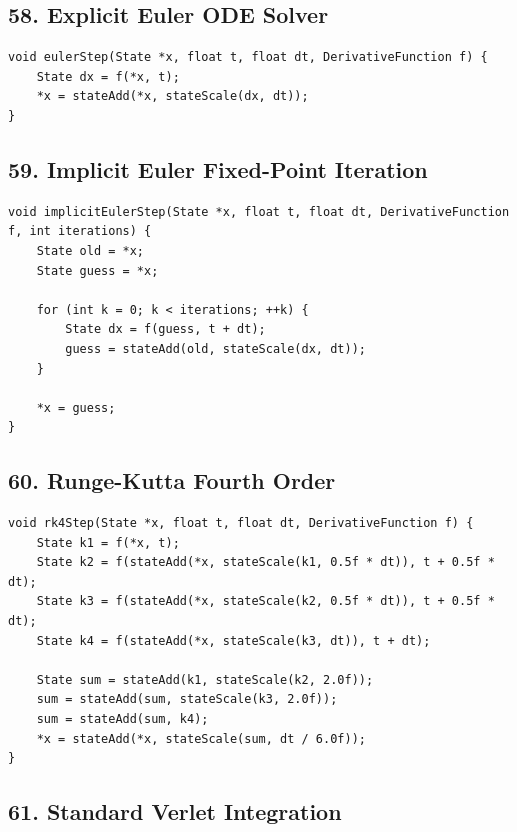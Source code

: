\documentclass[10pt,letterpaper]{article}
\begin{document}
\subsection*{58. Explicit Euler ODE Solver}

\begin{verbatim}
void eulerStep(State *x, float t, float dt, DerivativeFunction f) {
    State dx = f(*x, t);
    *x = stateAdd(*x, stateScale(dx, dt));
}
\end{verbatim}

\subsection*{59. Implicit Euler Fixed-Point Iteration}

\begin{verbatim}
void implicitEulerStep(State *x, float t, float dt, DerivativeFunction f, int iterations) {
    State old = *x;
    State guess = *x;

    for (int k = 0; k < iterations; ++k) {
        State dx = f(guess, t + dt);
        guess = stateAdd(old, stateScale(dx, dt));
    }

    *x = guess;
}
\end{verbatim}

\subsection*{60. Runge-Kutta Fourth Order}

\begin{verbatim}
void rk4Step(State *x, float t, float dt, DerivativeFunction f) {
    State k1 = f(*x, t);
    State k2 = f(stateAdd(*x, stateScale(k1, 0.5f * dt)), t + 0.5f * dt);
    State k3 = f(stateAdd(*x, stateScale(k2, 0.5f * dt)), t + 0.5f * dt);
    State k4 = f(stateAdd(*x, stateScale(k3, dt)), t + dt);

    State sum = stateAdd(k1, stateScale(k2, 2.0f));
    sum = stateAdd(sum, stateScale(k3, 2.0f));
    sum = stateAdd(sum, k4);
    *x = stateAdd(*x, stateScale(sum, dt / 6.0f));
}
\end{verbatim}

\subsection*{61. Standard Verlet Integration}
\end{document}
